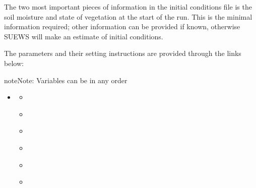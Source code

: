 \documentclass[letterpaper,10pt,english]{sphinxmanual}
\begin{document}
The two most important pieces of information in the initial conditions
file is the soil moisture and state of vegetation at the start of the
run. This is the minimal information required; other information can be
provided if known, otherwise SUEWS will make an estimate of initial
conditions.

The parameters and their setting instructions are provided through the links below:

\begin{sphinxadmonition}{note}{Note:}
Variables can be in any order
\end{sphinxadmonition}
\begin{itemize}
\item {} 
{\hyperref[\detokenize{input_files/Initial_Conditions/Soil_moisture_states:soil-moisture-states}]{}}
\begin{itemize}\setlength{\itemsep}{0pt}\setlength{\parskip}{0pt}
\item {} 
{\hyperref[\detokenize{input_files/Initial_Conditions/Soil_moisture_states:cmdoption-arg-soilstorepavedstate}]{}}

\item {} 
{\hyperref[\detokenize{input_files/Initial_Conditions/Soil_moisture_states:cmdoption-arg-soilstorebldgsstate}]{}}

\item {} 
{\hyperref[\detokenize{input_files/Initial_Conditions/Soil_moisture_states:cmdoption-arg-soilstoreevetrstate}]{}}

\item {} 
{\hyperref[\detokenize{input_files/Initial_Conditions/Soil_moisture_states:cmdoption-arg-soilstoredectrstate}]{}}

\item {} 
{\hyperref[\detokenize{input_files/Initial_Conditions/Soil_moisture_states:cmdoption-arg-soilstoregrassstate}]{}}

\item {} 
{\hyperref[\detokenize{input_files/Initial_Conditions/Soil_moisture_states:cmdoption-arg-soilstorebsoilstate}]{}}


\end{itemize}
\end{itemize}
\end{document}
